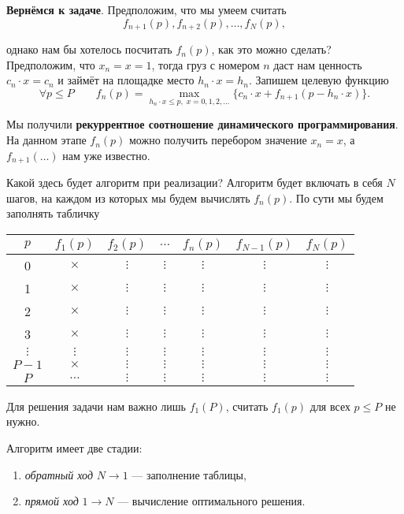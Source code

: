 \textbf{Вернёмся к задаче}. Предположим, что мы умеем считать
\[
	f_{n+1}(p), f_{n+2}(p), \dots, f_{N}(p),
\]

однако нам бы хотелось посчитать $f_n(p)$, как это можно сделать? Предположим, что $x_n = x = 1$, тогда груз с номером $n$ даст нам ценность $c_n \cdot x = c_n$ и займёт на площадке место $h_n \cdot x = h_n$. Запишем целевую функцию
\[
	\forall p \le P \qquad f_n(p) = \max_{h_n \cdot x \le p, \; x = 0, 1, 2, \dots} \big\{c_n \cdot x + f_{n+1}(p - h_n \cdot x)\big\}.
\]

Мы получили \textbf{рекуррентное соотношение динамического программирования}. На данном этапе $f_n(p)$ можно получить перебором значение $x_n = x$, а $f_{n+1}(\dots)$ нам уже известно.

Какой здесь будет алгоритм при реализации? Алгоритм будет включать в себя $N$ шагов, на каждом из которых мы будем вычислять $f_n(p)$. По сути мы будем заполнять табличку

\begin{table}[h!]
	\centering
	\begin{tabular}{|c|  c | c | c | c | c| c|} 
		\hline
		$p$ & $f_1(p)$ & $f_2(p)$ & $\dots$ & $f_n(p)$ & $f_{N-1}(p)$ & $f_N(p)$\\ [0.5ex] 
		\hline
		0 & $\times$ & $\vdots$ & $\vdots$ & $\vdots$ & $\vdots$ & $\vdots$ \\ 
		1 & $\times$ & $\vdots$ & $\vdots$ & $\vdots$ & $\vdots$ & $\vdots$ \\
		2 & $\times$ & $\vdots$ & $\vdots$ & $\vdots$ & $\vdots$ & $\vdots$ \\
		3 & $\times$ & $\vdots$ & $\vdots$ & $\vdots$ & $\vdots$ & $\vdots$ \\
		$\vdots$ & $\vdots$ & $\vdots$ & $\vdots$ & $\vdots$ & $\vdots$ & $\vdots$ \\
		$P-1$ & $\times$ & $\vdots$ & $\vdots$ & $\vdots$ & $\vdots$ & $\vdots$ \\
		$P$ & $\dots$ & $\vdots$ & $\vdots$ & $\vdots$ & $\vdots$ & $\vdots$ \\ [1ex] 
		\hline
	\end{tabular}
\end{table}

Для решения задачи нам важно лишь $f_1(P)$, считать $f_1(p)$ для всех $p \le P$ не нужно.

Алгоритм имеет две стадии:
\begin{enumerate}[nosep]
	\item \textit{обратный ход} $N \to 1$ --- заполнение таблицы,
	
	\item \textit{прямой ход} $1 \to N$ --- вычисление оптимального решения.
\end{enumerate}

